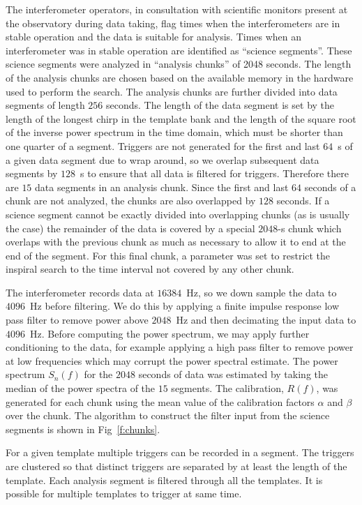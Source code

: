 The interferometer operators, in consultation with scientific monitors present
at the observatory during data taking, flag times when the interferometers are
in stable operation and the data is suitable for analysis.  Times when an
interferometer was in stable operation are identified as ``science segments''.
These science segments were analyzed in ``analysis chunks'' of 2048 seconds.
The length of the analysis chunks are chosen based on the available memory in
the hardware used to perform the search.  The analysis chunks are further
divided into data segments of length $256$ seconds. The length of the data
segment is set by the length of the longest chirp in the template bank and the
length of the square root of the inverse power spectrum in the time domain,
which must be shorter than one quarter of a segment.  Triggers are not
generated for the first and last $64$~s of a given data segment due to wrap
around, so we overlap subsequent data segments by $128$~s to ensure that all
data is filtered for triggers. Therefore there are $15$ data segments in an
analysis chunk. Since the first and last $64$ seconds of a chunk are not
analyzed, the chunks are also overlapped by $128$ seconds.  If a science
segment cannot be exactly divided into overlapping chunks (as is usually the
case) the remainder of the data is covered by a special $2048$-s chunk which
overlaps with the previous chunk as much as necessary to allow it to end at
the end of the segment.  For this final chunk, a parameter was set to restrict
the inspiral search to the time interval not covered by any other chunk. 

The interferometer records data at $16384$~Hz, so we down sample the data to
$4096$~Hz before filtering. We do this by applying a finite impulse response
low pass filter to remove power above $2048$~Hz and then decimating the input
data to $4096$~Hz. Before computing the power spectrum, we may apply further
conditioning to the data, for example applying a high pass filter to remove
power at low frequencies which may corrupt the power spectral estimate.  The
power spectrum $S_n(f)$ for the $2048$ seconds of data was estimated by taking
the median of the power spectra of the $15$ segments.  The calibration,
$R(f)$, was generated for each chunk using the mean value of the calibration
factors $\alpha$ and $\beta$ over the chunk.  The algorithm to construct the
filter input from the science segments is shown in Fig~\ref{f:chunks}.

For a given template multiple triggers can be recorded in a segment.  The
triggers are clustered so that distinct triggers are separated by at least the
length of the template.  Each analysis segment is filtered through all the
templates. It is possible for multiple templates to trigger at same time.

